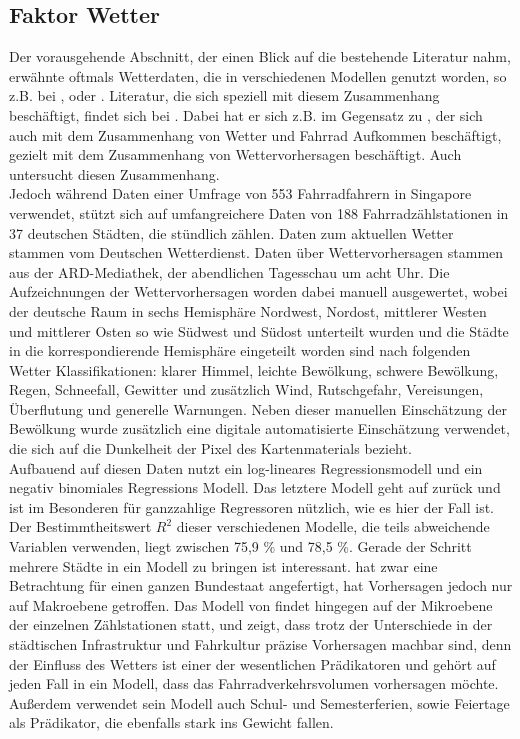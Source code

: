 \documentclass[a4paper,12pt]{thesis}
\begin{document}
\subsection{Faktor Wetter}

Der vorausgehende Abschnitt, der einen Blick auf die bestehende Literatur nahm, erwähnte oftmals Wetterdaten, die in verschiedenen Modellen genutzt worden, so z.B. bei \cite{Holmgren2017}, \cite{Broucke2019} oder \cite{Li2015}. Literatur, die sich speziell mit diesem Zusammenhang beschäftigt, findet sich bei \cite{Wessel2020}. Dabei hat er sich z.B. im Gegensatz zu \cite{Nankervis1999}, der sich auch mit dem Zusammenhang von Wetter und Fahrrad Aufkommen beschäftigt, gezielt mit dem Zusammenhang von Wettervorhersagen beschäftigt. Auch \cite{Meng2016} untersucht diesen Zusammenhang.\\
Jedoch während \cite{Meng2016} Daten einer Umfrage von 553 Fahrradfahrern in Singapore verwendet, stützt sich \cite{Wessel2020} auf umfangreichere Daten von 188 Fahrradzählstationen in 37 deutschen Städten, die stündlich zählen. Daten zum aktuellen Wetter stammen vom Deutschen Wetterdienst. Daten über Wettervorhersagen stammen aus der ARD-Mediathek, der abendlichen Tagesschau um acht Uhr. Die Aufzeichnungen der Wettervorhersagen worden dabei manuell ausgewertet, wobei der deutsche Raum in sechs Hemisphäre Nordwest, Nordost, mittlerer Westen und mittlerer Osten so wie Südwest und Südost unterteilt wurden und die Städte in die korrespondierende Hemisphäre eingeteilt worden sind nach folgenden Wetter Klassifikationen: klarer Himmel, leichte Bewölkung, schwere Bewölkung, Regen, Schneefall, Gewitter und zusätzlich Wind, Rutschgefahr, Vereisungen, Überflutung und generelle Warnungen. Neben dieser manuellen Einschätzung der Bewölkung wurde zusätzlich eine digitale automatisierte Einschätzung verwendet, die sich auf die Dunkelheit der Pixel des Kartenmaterials bezieht.\\
Aufbauend auf diesen Daten nutzt \cite{Wessel2020} ein log-lineares Regressionsmodell und ein negativ binomiales Regressions Modell. Das letztere Modell geht auf \cite{Hausman1984} zurück und ist im Besonderen für ganzzahlige Regressoren nützlich, wie es hier der Fall ist. Der Bestimmtheitswert $R^2$ dieser verschiedenen Modelle, die teils abweichende Variablen verwenden, liegt zwischen 75,9 \% und 78,5 \%. Gerade der Schritt mehrere Städte in ein Modell zu bringen ist interessant. \cite{Saha2018} hat zwar eine Betrachtung für einen ganzen Bundestaat angefertigt, hat Vorhersagen jedoch nur auf Makroebene getroffen. Das Modell von \cite{Wessel2020} findet hingegen auf der Mikroebene der einzelnen Zählstationen statt, und zeigt, dass trotz der Unterschiede in der städtischen Infrastruktur und Fahrkultur präzise Vorhersagen machbar sind, denn der Einfluss des Wetters ist einer der wesentlichen Prädikatoren und gehört auf jeden Fall in ein Modell, dass das Fahrradverkehrsvolumen vorhersagen möchte. Außerdem verwendet sein Modell auch Schul- und Semesterferien, sowie Feiertage als Prädikator, die ebenfalls stark ins Gewicht fallen.\\
\end{document}
